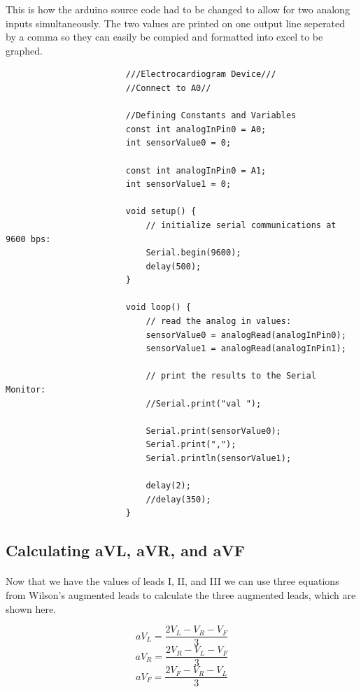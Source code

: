 \documentclass[12pt]{article}
\begin{document}
				This is how the arduino source code had to be changed to allow for two analong inputs simultaneously.  The two values are printed on one
				output line seperated by a comma so they can easily be compied and formatted into excel to be graphed.

				\begin{center}
					\begin{verbatim}
						///Electrocardiogram Device///
						//Connect to A0//

						//Defining Constants and Variables
						const int analogInPin0 = A0;  
						int sensorValue0 = 0;

						const int analogInPin0 = A1;
						int sensorValue1 = 0;

						void setup() {
  							// initialize serial communications at 9600 bps:
 							Serial.begin(9600);
 							delay(500);
						}

						void loop() {
 				 			// read the analog in values:
 							sensorValue0 = analogRead(analogInPin0);
  							sensorValue1 = analogRead(analogInPin1);
  
  							// print the results to the Serial Monitor:
  							//Serial.print("val ");
  
 							Serial.print(sensorValue0);
  							Serial.print(",");
  							Serial.println(sensorValue1);
  
 	 						delay(2);
  							//delay(350);
						}
					\end{verbatim}
				\end{center}

		\subsection{Calculating aVL, aVR, and aVF}
			\paragraph{}
				Now that we have the values of leads I, II, and III we can use three equations from Wilson's augmented leads to calculate the three 
				augmented leads, which are shown here.

				\begin{equation}
					aV_L = \frac{2V_L-V_R-V_F}{3}
				\end{equation}
				\begin{equation}
					aV_R = \frac{2V_R-V_L-V_F}{3}
				\end{equation}
				\begin{equation}
					aV_F = \frac{2V_F-V_R-V_L}{3}
				\end{equation}
\end{document}
